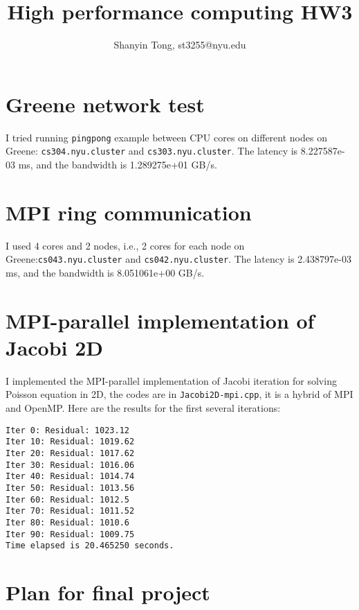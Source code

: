 \documentclass[10pt,a4paper]{article}
\theoremstyle{dotlessP}
\begin{document}
\title{High performance computing HW3}
\author{Shanyin Tong, st3255@nyu.edu}

\maketitle

\section{Greene network test}
I tried running \texttt{pingpong} example between CPU cores on different nodes on Greene: \texttt{cs304.nyu.cluster} and \texttt{cs303.nyu.cluster}. The latency is 8.227587e-03 ms, and the bandwidth is 1.289275e+01 GB/s.

\section{MPI ring communication}
I used 4 cores and 2 nodes, i.e., 2 cores for each node on Greene:\texttt{cs043.nyu.cluster} and \texttt{cs042.nyu.cluster}. The latency is 2.438797e-03 ms, and the bandwidth is 8.051061e+00 GB/s.

\section{MPI-parallel implementation of Jacobi 2D}
I implemented the MPI-parallel implementation of Jacobi iteration for solving Poisson equation in 2D, the codes are in \texttt{Jacobi2D-mpi.cpp}, it is a hybrid of MPI and OpenMP. Here are the results for the first several iterations:
\begin{lstlisting}
Iter 0: Residual: 1023.12
Iter 10: Residual: 1019.62
Iter 20: Residual: 1017.62
Iter 30: Residual: 1016.06
Iter 40: Residual: 1014.74
Iter 50: Residual: 1013.56
Iter 60: Residual: 1012.5
Iter 70: Residual: 1011.52
Iter 80: Residual: 1010.6
Iter 90: Residual: 1009.75
Time elapsed is 20.465250 seconds.
\end{lstlisting}

\section{Plan for final project}
\end{document}
